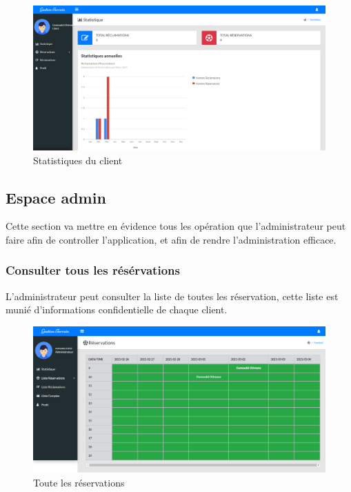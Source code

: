 \documentclass[a4paper]{report}
\begin{document}
\begin{spacing}{2}
\begin{figure}[!ht]
\begin{center}
\includegraphics[width=18cm]{Screenshots/stats-clients.jpg}
\end{center}
\caption[Statistiques du client]{Statistiques du client}
\end{figure}


\subsection{Espace admin}
Cette section va mettre en évidence tous les opération que l'administrateur peut faire afin de controller l'application, et afin de rendre l'administration efficace.
\subsubsection{Consulter tous les résérvations}
L'administrateur peut consulter la liste de toutes les réservation, cette liste est munié d'informations confidentielle de chaque client. 

\begin{figure}[!ht]
\begin{center}
\includegraphics[width=16cm]{Screenshots/ConsulterReserv.png}
\end{center}
\caption[Toute les réservations]{Toute les réservations}
\end{figure}


\end{spacing}
\end{document}
